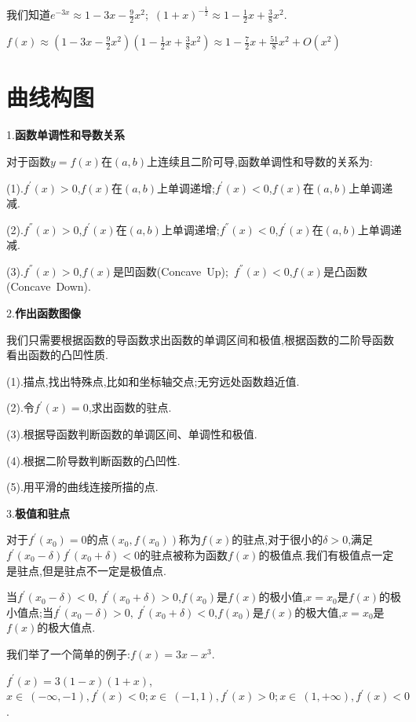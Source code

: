 \documentclass[oneside]{book}
\begin{document}
	我们知道$e^{-3x}\approx 1-3x-\frac{9}{2}x^{2}$;\ $(1+x)^{-\frac{1}{2}}\approx 1-\frac{1}{2}x+\frac{3}{8}x^{2}$.
	
	$f(x)\approx (1-3x-\frac{9}{2}x^{2})(1-\frac{1}{2}x+\frac{3}{8}x^{2})\approx 1-\frac{7}{2}x+\frac{51}{8}x^{2}+O(x^{2})$
	\chapter{曲线构图}
	
	1.\textbf{函数单调性和导数关系}
	
	对于函数$y=f(x)$在$(a,b)$上连续且二阶可导,函数单调性和导数的关系为:
	
	(1).$f^{'}(x)>0$,$f(x)$在$(a,b)$上单调递增;$f^{'}(x)<0$,$f(x)$在$(a,b)$上单调递减.
	
	(2).$f^{''}(x)>0$,$f^{'}(x)$在$(a,b)$上单调递增;$f^{''}(x)<0$,$f^{'}(x)$在$(a,b)$上单调递减.
	
	(3).$f^{''}(x)>0$,$f(x)$是凹函数(Concave\ Up);\ $f^{''}(x)<0$,$f(x)$是凸函数(Concave\ Down).
	
	2.\textbf{作出函数图像}
	
	我们只需要根据函数的导函数求出函数的单调区间和极值,根据函数的二阶导函数看出函数的凸凹性质.
	
	(1).描点,找出特殊点,比如和坐标轴交点;无穷远处函数趋近值.
	
	(2).令$f^{'}(x)=0$,求出函数的驻点.
	
	(3).根据导函数判断函数的单调区间、单调性和极值.
	
	(4).根据二阶导数判断函数的凸凹性.
	
	(5).用平滑的曲线连接所描的点.
	
	3.\textbf{极值和驻点}
	
	对于$f^{'}(x_{0})=0$的点$(x_{0},f(x_{0}))$称为$f(x)$的驻点,对于很小的$\delta>0$,满足$f^{'}(x_{0}-\delta)f^{'}(x_{0}+\delta)<0$的驻点被称为函数$f(x)$的极值点.我们有极值点一定是驻点,但是驻点不一定是极值点.
	
	当$f^{'}(x_{0}-\delta)<0,\ f^{'}(x_{0}+\delta)>0$,$f(x_{0})$是$f(x)$的极小值,$x=x_{0}$是$f(x)$的极小值点;当$f^{'}(x_{0}-\delta)>0,\ f^{'}(x_{0}+\delta)<0$,$f(x_{0})$是$f(x)$的极大值,$x=x_{0}$是$f(x)$的极大值点.
	
	我们举了一个简单的例子:$f(x)=3x-x^{3}$.
	
	$f^{'}(x)=3(1-x)(1+x)$,$x\in\ (-\infty,-1),f^{'}(x)<0;x\in\ (-1,1),f^{'}(x)>0;x\in\ (1,+\infty),f^{'}(x)<0$.
	
\end{document}
